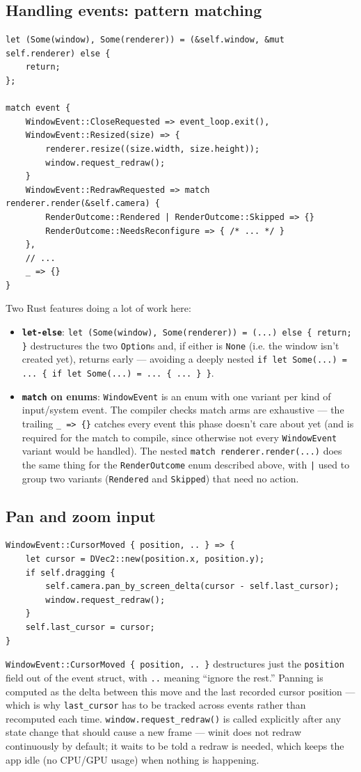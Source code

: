 \documentclass[11pt]{article}
\begin{document}
\subsection{Handling events: pattern matching}
\begin{lstlisting}
let (Some(window), Some(renderer)) = (&self.window, &mut self.renderer) else {
    return;
};

match event {
    WindowEvent::CloseRequested => event_loop.exit(),
    WindowEvent::Resized(size) => {
        renderer.resize((size.width, size.height));
        window.request_redraw();
    }
    WindowEvent::RedrawRequested => match renderer.render(&self.camera) {
        RenderOutcome::Rendered | RenderOutcome::Skipped => {}
        RenderOutcome::NeedsReconfigure => { /* ... */ }
    },
    // ...
    _ => {}
}
\end{lstlisting}
Two Rust features doing a lot of work here:
\begin{itemize}
  \item \textbf{\texttt{let-else}}: \texttt{let (Some(window), Some(renderer)) = (...) else
    \{ return; \}} destructures the two \texttt{Option}s and, if either is \texttt{None}
    (i.e. the window isn't created yet), returns early — avoiding a deeply nested
    \texttt{if let Some(...) = ... \{ if let Some(...) = ... \{ ... \} \}}.
  \item \textbf{\texttt{match} on enums}: \texttt{WindowEvent} is an enum with one variant
    per kind of input/system event. The compiler checks match arms are exhaustive — the
    trailing \texttt{\_ => \{\}} catches every event this phase doesn't care about yet (and
    is required for the match to compile, since otherwise not every \texttt{WindowEvent}
    variant would be handled). The nested \texttt{match renderer.render(...)} does the same
    thing for the \texttt{RenderOutcome} enum described above, with \texttt{|} used to
    group two variants (\texttt{Rendered} and \texttt{Skipped}) that need no action.
\end{itemize}

\subsection{Pan and zoom input}
\begin{lstlisting}
WindowEvent::CursorMoved { position, .. } => {
    let cursor = DVec2::new(position.x, position.y);
    if self.dragging {
        self.camera.pan_by_screen_delta(cursor - self.last_cursor);
        window.request_redraw();
    }
    self.last_cursor = cursor;
}
\end{lstlisting}
\texttt{WindowEvent::CursorMoved \{ position, .. \}} destructures just the \texttt{position}
field out of the event struct, with \texttt{..} meaning ``ignore the rest.'' Panning is
computed as the delta between this move and the last recorded cursor position — which is
why \texttt{last\_cursor} has to be tracked across events rather than recomputed each time.
\texttt{window.request\_redraw()} is called explicitly after any state change that should
cause a new frame — winit does not redraw continuously by default; it waits to be told a
redraw is needed, which keeps the app idle (no CPU/GPU usage) when nothing is happening.
\end{document}
